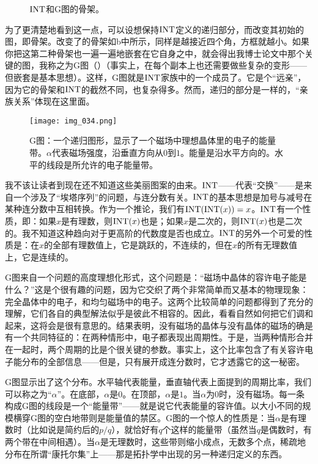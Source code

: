 \begin{sidewaysfigure}
  {\caption{$\operatorname{INT}$和G图的骨架。}}
\end{sidewaysfigure}

为了更清楚地看到这一点，可以设想保持$\operatorname{INT}$定义的递归部分，而改变其初始的图，即骨架。改变了的骨架如b中所示，同样是越接近四个角，方框就越小。如果你把这第二种骨架也一遍一遍地嵌套在它自身之中，就会得出我博士论文中那个关键的图，我称之为G图（）（事实上，在每个副本上也还需要做些复杂的变形——但嵌套是基本思想）。这样，G图就是$\operatorname{INT}$家族中的一个成员了。它是个“远亲”，因为它的骨架和$\operatorname{INT}$的截然不同，也复杂得多。然而，递归的部分是一样的，“亲族关系”体现在这里面。

\begin{figure}
\texttt{[image: img\_034.png]}
\caption[G图：一个递归图形。]
  {G图：一个递归图形，显示了一个磁场中理想晶体里的电子的能量带。$\alpha$代表磁场强度，沿垂直方向从$0$到$1$。能量是沿水平方向的。水平的线段是所允许的电子能量带。}
\end{figure}

我不该让读者到现在还不知道这些美丽图案的由来。$\operatorname{INT}$——代表“交换”——是来自一个涉及了“埃塔序列”的问题，与连分数有关。$\operatorname{INT}$的基本思想是加号与减号在某种连分数中互相转换。作为一个推论，我们有$\operatorname{INT}(\operatorname{INT}(x))=x$。$\operatorname{INT}$有一个性质，即：如果$x$是有理数，则$\operatorname{INT}(x)$也是；如果$x$是二次的，则$\operatorname{INT}(x)$也是二次的。我不知道这种趋向对于更高阶的代数度是否也成立。$\operatorname{INT}$的另外一个可爱的性质是：在$x$的全部有理数值上，它是跳跃的，不连续的，但在$x$的所有无理数值上，它是连续的。

G图来自一个问题的高度理想化形式，这个问题是：“磁场中晶体的容许电子能是什么？”这是个很有趣的问题，因为它交织了两个非常简单而又基本的物理现象：完全晶体中的电子，和均匀磁场中的电子。这两个比较简单的问题都得到了充分的理解，它们各自的典型解法似乎是彼此不相容的。因此，看看自然如何把它们调和起来，这将会是很有意思的。结果表明，没有磁场的晶体与没有晶体的磁场的确是有一个共同特征的：在两种情形中，电子都表现出周期性。于是，当两种情形合并在一起时，两个周期的比是个很关键的参数。事实上，这个比率包含了有关容许电子能分布的全部信息——但是，只有展开成连分数时，它才透露它的这一秘密。

G图显示出了这个分布。水平轴代表能量，垂直轴代表上面提到的周期比率，我们可以称之为“$\alpha$”。在底部，$\alpha$是$0$。在顶部，$\alpha$是$1$。当$\alpha$为$0$时，没有磁场。每一条构成G图的线段是一个“能量带”——就是说它代表能量的容许值。以大小不同的规模横穿G图的空白地带则是能量值的禁区。G图的一个惊人的性质是：当$\alpha$是有理数时（比如说是简约后的$p/q$），就恰好有$q$个这样的能量带（虽然当$q$是偶数时，有两个带在中间相遇）。当$\alpha$是无理数时，这些带则缩小成点，无数多个点，稀疏地分布在所谓“康托尔集”上——那是拓扑学中出现的另一种递归定义的东西。

